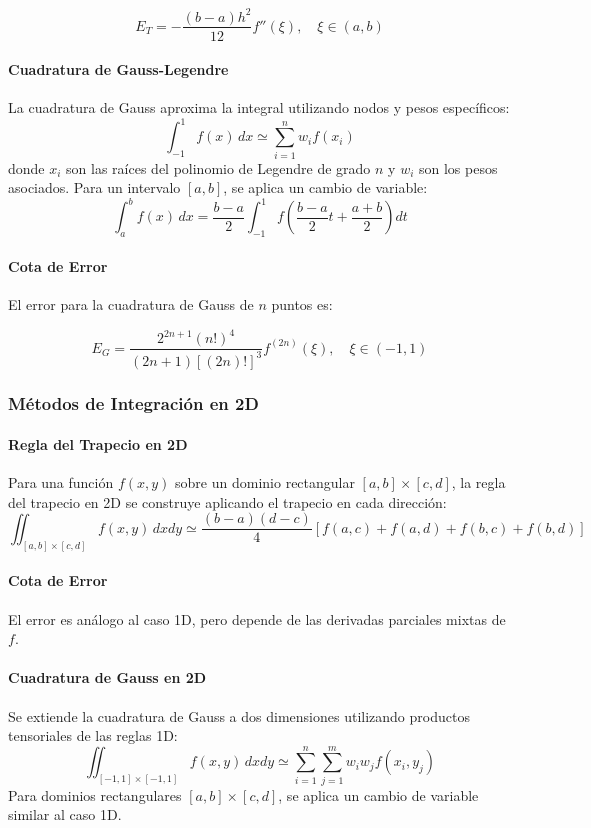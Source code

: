 \documentclass[11pt]{book}
\theoremstyle{definicion}
\theoremstyle{teorema}
\theoremstyle{ejemplo}
\begin{document}
\[
E_T = -\frac{(b - a) h^2}{12} f''(\xi), \quad \xi \in (a, b)
\]

\paragraph{Cuadratura de Gauss-Legendre}
La cuadratura de Gauss aproxima la integral utilizando nodos y pesos específicos:
\[
\int_{-1}^{1} f(x) \, dx \simeq \sum_{i=1}^{n} w_i f(x_i)
\]
donde \( x_i \) son las raíces del polinomio de Legendre de grado \( n \) y \( w_i \) son los pesos asociados. Para un intervalo \([a, b]\), se aplica un cambio de variable:
\[
\int_{a}^{b} f(x) \, dx = \frac{b - a}{2} \int_{-1}^{1} f\left(\frac{b - a}{2} t + \frac{a + b}{2}\right) dt
\]
\paragraph{Cota de Error}
El error para la cuadratura de Gauss de \( n \) puntos es:

\[
E_G = \frac{2^{2n+1} (n!)^4}{(2n+1) [(2n)!]^3} f^{(2n)}(\xi), \quad \xi \in (-1, 1)
\]

\subsubsection{Métodos de Integración en 2D}

\paragraph{Regla del Trapecio en 2D}
Para una función \( f(x, y) \) sobre un dominio rectangular \([a, b] \times [c, d]\), la regla del trapecio en 2D se construye aplicando el trapecio en cada dirección:
\[
\iint_{[a,b] \times [c,d]} f(x, y) \, dx dy \simeq \frac{(b - a)(d - c)}{4} \left[ f(a, c) + f(a, d) + f(b, c) + f(b, d) \right]
\]
\paragraph{Cota de Error}
El error es análogo al caso 1D, pero depende de las derivadas parciales mixtas de \( f \).

\paragraph{Cuadratura de Gauss en 2D}
Se extiende la cuadratura de Gauss a dos dimensiones utilizando productos tensoriales de las reglas 1D:
\[
\iint_{[-1,1] \times [-1,1]} f(x, y) \, dx dy \simeq \sum_{i=1}^{n} \sum_{j=1}^{m} w_i w_j f(x_i, y_j)
\]
Para dominios rectangulares \([a, b] \times [c, d]\), se aplica un cambio de variable similar al caso 1D.
\end{document}
